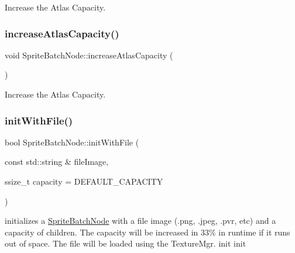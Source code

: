 Increase the Atlas Capacity. \mbox{\label{classSpriteBatchNode_ad76d544ea06e10d6413ab978c868bc70}} 
\subsubsection{\texorpdfstring{increase\+Atlas\+Capacity()}{increaseAtlasCapacity()}\hspace{0.1cm}{\footnotesize\ttfamily [2/2]}}
{\footnotesize\ttfamily void Sprite\+Batch\+Node\+::increase\+Atlas\+Capacity (\begin{DoxyParamCaption}{ }\end{DoxyParamCaption})}

Increase the Atlas Capacity. \mbox{\label{classSpriteBatchNode_af6150c9adf70652842ca6e7b01c8cc08}} 
\subsubsection{\texorpdfstring{init\+With\+File()}{initWithFile()}\hspace{0.1cm}{\footnotesize\ttfamily [1/2]}}
{\footnotesize\ttfamily bool Sprite\+Batch\+Node\+::init\+With\+File (\begin{DoxyParamCaption}\item[{const std\+::string \&}]{file\+Image,  }\item[{ssize\+\_\+t}]{capacity = {\ttfamily DEFAULT\+\_\+CAPACITY} }\end{DoxyParamCaption})}

initializes a \hyperlink{classSpriteBatchNode}{Sprite\+Batch\+Node} with a file image (.png, .jpeg, .pvr, etc) and a capacity of children. The capacity will be increased in 33\% in runtime if it runs out of space. The file will be loaded using the Texture\+Mgr.  init  init \mbox{\label{classSpriteBatchNode_af6150c9adf70652842ca6e7b01c8cc08}} 
